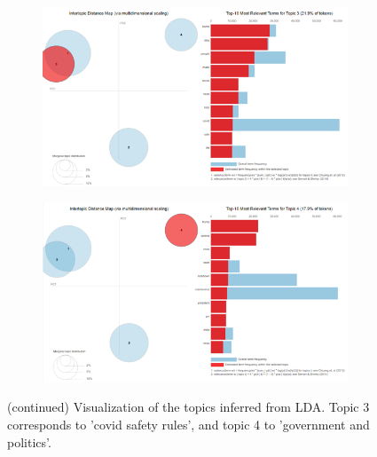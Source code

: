 \begin{figure}
 \ContinuedFloat
 \centering
 \begin{subfigure}{0.75\columnwidth}
 \includegraphics[width=1\textwidth]{images/lda3.png}
 \end{subfigure}
 \centering
 \begin{subfigure}{0.75\columnwidth}
 \includegraphics[width=1\textwidth]{images/lda4.png}
 \end{subfigure}
 \caption{(continued) Visualization of the topics inferred from LDA. Topic 3 corresponds to 'covid safety rules', and topic 4 to 'government and politics'.}
 \label{fig:lda_viz_2}
\end{figure}



